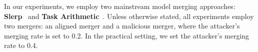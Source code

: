 In our experiments, we employ two mainstream model merging approaches: \textbf{Slerp}~\cite{goddard2024arcee} and \textbf{Task Arithmetic}~\cite{ilharcoediting}. Unless otherwise stated, all experiments employ two mergers: an aligned merger and a malicious merger, where the attacker's merging rate is set to 0.2. In the practical setting, we set the attacker's merging rate to 0.4. 






